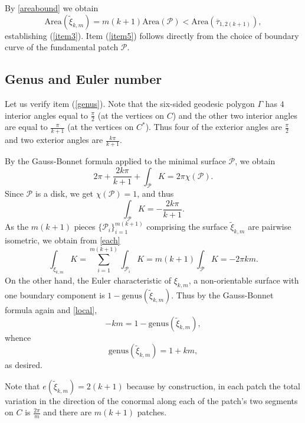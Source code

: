 \documentclass[11pt, reqno]{amsart}
\numberwithin{equation}{section}
\begin{document}
By \eqref{areabound} we obtain
\begin{equation}\label{areaboundagain}
\mbox{Area}(\tilde{\xi}_{k,m})=m(k+1)\mbox{Area}(\mathcal{P})< \mbox{Area}(\overline{\tau}_{1,2(k+1)}), 
\end{equation}
establishing (\ref{item3}).  Item (\ref{item5}) follows directly from the choice of boundary curve of the fundamental patch $\mathcal{P}$.  

\subsection{Genus and Euler number}
Let us verify item (\ref{genus}).  Note that the six-sided geodesic polygon $\Gamma$ has $4$ interior angles equal to $\frac{\pi}{2}$ (at the vertices on $C$) and the other two interior angles are equal to $\frac{\pi}{k+1}$ (at the vertices on $C^*$).  Thus four of the exterior angles are $\frac{\pi}{2}$ and two exterior angles are $\frac{k\pi}{k+1}$. 

By the Gauss-Bonnet formula applied to the minimal surface $\mathcal{P}$, we obtain
\begin{equation}
2\pi+\frac{2k\pi}{k+1}+\int_\mathcal{P} K = 2\pi\chi(\mathcal{P}).  
\end{equation}
Since $\mathcal{P}$ is a disk, we get $\chi(\mathcal{P})=1$, and thus
\begin{equation}\label{each}
\int_\mathcal{P} K=-\frac{2k\pi}{k+1}.
\end{equation}
As the $m(k+1)$ pieces $\{\mathcal{P}_i\}_{i=1}^{m(k+1)}$ comprising the surface $\tilde{\xi}_{k,m}$ are pairwise isometric, we obtain from \eqref{each}
\begin{equation}\label{local}
\int_{\tilde{\xi}_{k,m}}K =\sum_{i=1}^{m(k+1)}\int_{\mathcal{P}_i} K=m(k+1)\int_{\mathcal{P}}K=-2\pi km.
\end{equation}
On the other hand, the Euler characteristic of $\xi_{k,m}$, a non-orientable surface with one boundary component is $1-\mbox{genus}(\tilde{\xi}_{k,m})$.  Thus by the Gauss-Bonnet formula again and \eqref{local}, 
\begin{equation}
-km = 1-\mbox{genus}(\tilde{\xi}_{k,m}), 
\end{equation}
whence
\begin{equation}
\mbox{genus}(\tilde{\xi}_{k,m})=1+km, 
\end{equation}
as desired.

Note that $e(\tilde{\xi}_{k,m})=2(k+1)$ because by construction, in each patch the total variation in the direction of the conormal along each of the patch's two segments on $C$ is $\frac{2\pi}{m}$ and there are $m(k+1)$ patches.  
\end{document}
